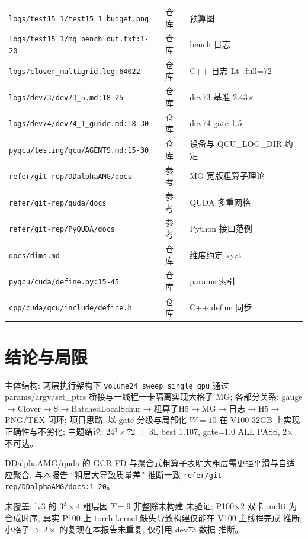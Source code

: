 \documentclass[UTF8]{ctexart}
\begin{document}
\begin{xltabular}{\textwidth}{llX}
\texttt{\nolinkurl{logs/test15_1/test15_1_budget.png}} & 仓库 & 预算图 \\
\texttt{\nolinkurl{logs/test15_1/mg_bench_out.txt:1-20}} & 仓库 & bench 日志 \\
\texttt{\nolinkurl{logs/clover_multigrid.log:64022}} & 仓库 & C++ 日志 Lt\_full=72 \\
\texttt{\nolinkurl{logs/dev73/dev73_5.md:18-25}} & 仓库 & dev73 基准 2.43$\times$ \\
\texttt{\nolinkurl{logs/dev74/dev74_1_guide.md:18-30}} & 仓库 & dev74 gate 1.5 \\
\texttt{\nolinkurl{pyqcu/testing/qcu/AGENTS.md:15-30}} & 仓库 & 设备与 QCU\_LOG\_DIR 约定 \\
\texttt{\nolinkurl{refer/git-rep/DDalphaAMG/docs}} & 参考 & MG 宽版粗算子理论 \\
\texttt{\nolinkurl{refer/git-rep/quda/docs}} & 参考 & QUDA 多重网格 \\
\texttt{\nolinkurl{refer/git-rep/PyQUDA/docs}} & 参考 & Python 接口范例 \\
\texttt{\nolinkurl{docs/dims.md}} & 仓库 & 维度约定 xyzt \\
\texttt{\nolinkurl{pyqcu/cuda/define.py:15-45}} & 仓库 & params 索引 \\
\texttt{\nolinkurl{cpp/cuda/qcu/include/define.h}} & 仓库 & C++ define 同步 \\
\bottomrule
\end{xltabular}

\section{结论与局限}
\begin{conclbox}
主体结构: 两层执行架构下 \texttt{\nolinkurl{volume24_sweep_single_gpu}} 通过 params/argv/set\_ptrs 桥接与一线程一卡隔离实现大格子 MG; 各部分关系: gauge$\to$Clover$\to$S$\to$BatchedLocalSchur$\to$粗算子H5$\to$MG$\to$日志$\to$H5$\to$PNG/TEX 闭环; 项目思路: 以 gate 分级与局部化 $W=10$ 在 V100 32GB 上实现正确性与不劣化; 主题结论: 24$^3\times$72 上 3L best 1.107, gate=1.0 ALL PASS, 2$\times$ 不可达。
\end{conclbox}
\begin{refbox}
DDalphaAMG/quda 的 GCR-FD 与聚合式粗算子表明大粗层需更强平滑与自适应聚合, 与本报告 ``粗层大导致质量差'' 推断一致 \textcolor{evidence}{\texttt{\nolinkurl{refer/git-rep/DDalphaAMG/docs:1-20}}}。
\end{refbox}
\begin{warnbox}
未覆盖: lv3 的 3$^3\times$4 粗层因 $T=9$ 非整除未构建 \textcolor{warn}{未验证}; P100$\times$2 双卡 multi 为合成时序, 真实 P100 上 torch kernel 缺失导致构建仅能在 V100 主线程完成 \textcolor{warn}{推断}; 小格子 $>2\times$ 的复现在本报告未重复, 仅引用 dev73 数据 \textcolor{warn}{推断}。
\end{warnbox}
\end{document}
